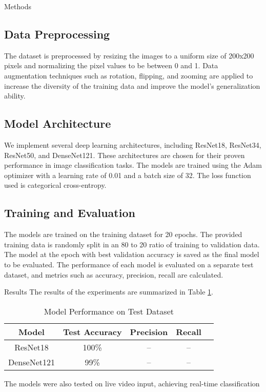 \documentclass[12pt, a4paper]{article}
\begin{document}
\begin{section}{Methods}
    \subsection{Data Preprocessing}
    The dataset is preprocessed by resizing the images to a uniform size of 200x200 pixels and normalizing the pixel values to be between 0 and 1. Data augmentation techniques such as rotation, flipping, and zooming are applied to increase the diversity of the training data and improve the model's generalization ability.

    \subsection{Model Architecture}
    We implement several deep learning architectures, including ResNet18, ResNet34, ResNet50, and DenseNet121. These architectures are chosen for their proven performance in image classification tasks. The models are trained using the Adam optimizer with a learning rate of 0.01 and a batch size of 32. The loss function used is categorical cross-entropy.

    \subsection{Training and Evaluation}
    The models are trained on the training dataset for 20 epochs. The provided training data is randomly split in an 80 to 20 ratio of training to validation data. The model at the epoch with best validation accuracy is saved as the final model to be evaluated. The performance of each model is evaluated on a separate test dataset, and metrics such as accuracy, precision, recall are calculated.
\end{section}

\begin{section}{Results}
    The results of the experiments are summarized in Table \ref{tab:results}. 
    \begin{table}[H]
        \centering
        \caption{Model Performance on Test Dataset}
        \label{tab:results}
        \begin{tabular}{|c|c|c|c|c|}
            \hline
            Model & Test Accuracy & Precision & Recall \\
            \hline
            ResNet18 &100\% & -- & -- \\
            DenseNet121 & 99\% & -- & --  \\
            \hline
        \end{tabular}
    \end{table}

    The models were also tested on live video input, achieving real-time classification 
\end{section}
\end{document}
